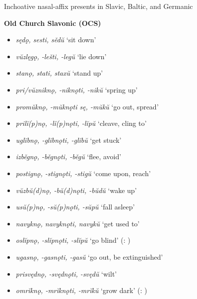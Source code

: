 \documentclass[output=paper,colorlinks,citecolor=brown]{langscibook}
\begin{document}
\begin{exe}
\ex Inchoative nasal-affix presents in Slavic, Baltic, and Germanic \label{ex:inchoa}
\begin{xlist}
    \ex \textbf{Old Church Slavonic (OCS)}
    \begin{itemize}
        \item \textit{sędǫ, sesti, sědŭ} ‘sit down’
        \item \textit{vŭzlęgǫ, -lešti, -legŭ} ‘lie down’
        \item \textit{stanǫ, stati, staxŭ} ‘stand up’
        \item \textit{pri/vŭzniknǫ, -niknǫti, -nikŭ} ‘spring up’
        \item \textit{promŭknǫ, -mŭknǫti sę, -mŭkŭ} ‘go out, spread’
        \item \textit{prilĭ(p)nǫ, -lĭ(p)nǫti, -lĭpŭ} ‘cleave, cling to’
        \item \textit{uglĭbnǫ, -glĭbnǫti, -glĭbŭ} ‘get stuck’
        \item \textit{izběgnǫ, -běgnǫti, -běgŭ} ‘flee, avoid’
        \item \textit{postignǫ, -stignǫti, -stigŭ} ‘come upon, reach’
        \item \textit{vŭzbŭ(d)nǫ, -bŭ(d)nǫti, -bŭdŭ} ‘wake up’
        \item \textit{usŭ(p)nǫ, -sŭ(p)nǫti, -sŭpŭ} ‘fall asleep’
        \item \textit{navyknǫ, navyknǫti, navykŭ} ‘get used to’
        \item \textit{oslĭpnǫ, -slĭpnǫti, -slĭpŭ} ‘go blind’ (: )
        \item \textit{ugasnǫ, -gasnǫti, -gasŭ} ‘go out, be extinguished’
        \item \textit{prisvędnǫ, -svędnǫti, -svędŭ} ‘wilt’
        \item \textit{omrĭknǫ, -mrĭknǫti, -mrĭkŭ} ‘grow dark’ (: )

\end{itemize}
\end{xlist}
\end{exe}
\end{document}
